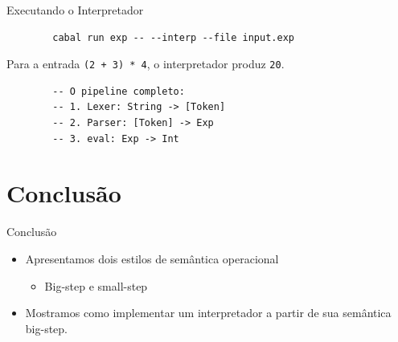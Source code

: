 \begin{frame}[fragile]{Executando o Interpretador}

    \begin{lstlisting}
        cabal run exp -- --interp --file input.exp
    \end{lstlisting}

    Para a entrada \texttt{(2 + 3) * 4}, o interpretador
    produz \texttt{20}.

    \begin{lstlisting}
        -- O pipeline completo:
        -- 1. Lexer: String -> [Token]
        -- 2. Parser: [Token] -> Exp
        -- 3. eval: Exp -> Int
    \end{lstlisting}
\end{frame}


\section{Conclusão}\label{conclusuxe3o}

\begin{frame}{Conclusão}

    \begin{itemize}

        \item
        Apresentamos dois estilos de semântica operacional

        \begin{itemize}

            \item
            Big-step e small-step
        \end{itemize}
        \item
        Mostramos como implementar um interpretador a partir de sua semântica
        big-step.
    \end{itemize}
\end{frame}
